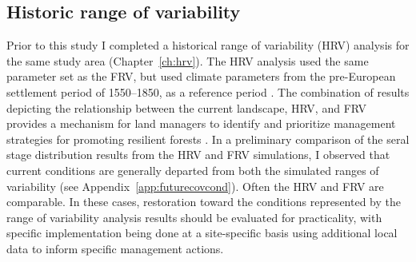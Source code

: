 



\subsection{Historic range of variability}
Prior to this study I completed a historical range of variability (HRV) analysis for the same study area (Chapter~\ref{ch:hrv}). The HRV analysis used the same parameter set as the FRV, but used climate parameters from the pre-European settlement period of 1550--1850, as a reference period \citep{Safford2013}. The combination of results depicting the relationship between the current landscape, HRV, and FRV provides a mechanism for land managers to identify and prioritize management strategies for promoting resilient forests \citep{Keane2009}. In a preliminary comparison of the seral stage distribution results from the HRV and FRV simulations, I observed that current conditions are generally departed from both the simulated ranges of variability (see Appendix~\ref{app:futurecovcond}). Often the HRV and FRV are comparable. In these cases, restoration toward the conditions represented by the range of variability analysis results should be evaluated for practicality, with specific implementation being done at a site-specific basis using additional local data to inform specific management actions.

